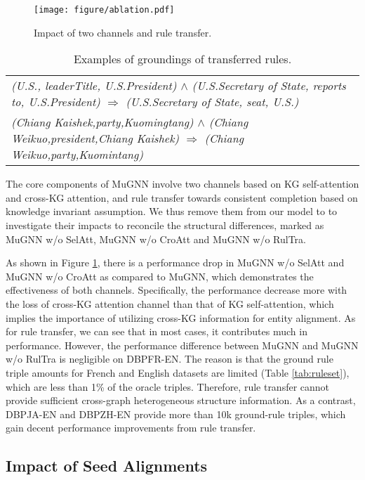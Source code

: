 \documentclass[11pt,a4paper]{article}
\begin{document}
\begin{figure}[htb]
	\centerline{\texttt{[image: figure/ablation.pdf]}}
	\caption{Impact of two channels and rule transfer.}
	\label{fig:ablation}
\end{figure}

\begin{table*}[htp]
\small
	\centering
	\begin{tabular}{p{15.5cm}}
		\toprule
\emph{(U.S., leaderTitle, U.S.President) $\wedge$ (U.S.Secretary of State, reports to, U.S.President) $\Rightarrow$ (U.S.Secretary of State, seat, U.S.)} \\
		\emph{(Chiang Kaishek,party,Kuomingtang) $\wedge$ (Chiang Weikuo,president,Chiang Kaishek) $\Rightarrow$ (Chiang Weikuo,party,Kuomintang)}                \\
\bottomrule
	\end{tabular}
	\caption{Examples of groundings of transferred rules.}
	\label{tab:gr_rule}
\end{table*}

The core components of MuGNN involve two channels based on KG self-attention and cross-KG attention, and rule transfer towards consistent completion based on knowledge invariant assumption. We thus remove them from our model to to investigate their impacts to reconcile the structural differences, marked as MuGNN w/o SelAtt, MuGNN w/o CroAtt and MuGNN w/o RulTra.

As shown in Figure \ref{fig:ablation}, there is a performance drop in MuGNN w/o SelAtt and MuGNN w/o CroAtt as compared to MuGNN, which demonstrates the effectiveness of both channels. Specifically, the performance decrease more with the loss of cross-KG attention channel than that of KG self-attention, which implies the importance of utilizing cross-KG information for entity alignment. As for rule transfer, we can see that in most cases, it contributes much in performance. However, the performance difference between MuGNN and MuGNN w/o RulTra is negligible on DBP{\tiny FR-EN}. The reason is that the ground rule triple amounts for French and English datasets are limited (Table \ref{tab:ruleset}), which are less than 1\% of the oracle triples. Therefore, rule transfer cannot provide sufficient cross-graph heterogeneous structure information. As a contrast, DBP{\tiny JA-EN} and DBP{\tiny ZH-EN} provide more than 10k ground-rule triples, which gain decent performance improvements from rule transfer.

\subsection{Impact of Seed Alignments}
\end{document}
